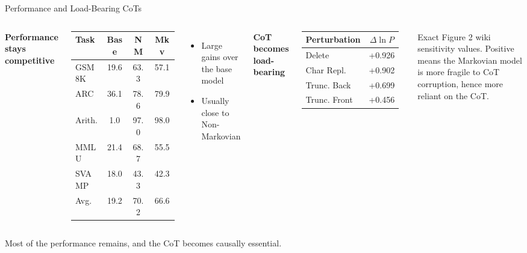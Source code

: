 \documentclass[aspectratio=169]{beamer}
\begin{document}
\begin{frame}{Performance and Load-Bearing CoTs}

\begin{columns}[T]
\textbf{Performance stays competitive}

\begin{table}
\centering
\tiny
\setlength{\tabcolsep}{3pt}
\begin{tabular}{lccc}
\toprule
Task & Base & NM & Mkv \\
\midrule
GSM8K & 19.6 & 63.3 & 57.1 \\
ARC & 36.1 & 78.6 & 79.9 \\
Arith. & 1.0 & 97.0 & 98.0 \\
MMLU & 21.4 & 68.7 & 55.5 \\
SVAMP & 18.0 & 43.3 & 42.3 \\
\midrule
Avg. & 19.2 & 70.2 & 66.6 \\
\bottomrule
\end{tabular}
\end{table}

\begin{itemize}
    \itemsep 0.15em
    \item Large gains over the base model
    \item Usually close to Non-Markovian
\end{itemize}

\textbf{CoT becomes load-bearing}

\begin{table}
\centering
\scriptsize
\begin{tabular}{lc}
\toprule
Perturbation & $\Delta \ln P$ \\
\midrule
Delete & +0.926 \\
Char Repl. & +0.902 \\
Trunc. Back & +0.699 \\
Trunc. Front & +0.456 \\
\bottomrule
\end{tabular}
\end{table}

\vspace{0.05cm}
\scriptsize Exact Figure 2 wiki sensitivity values. Positive means the Markovian model is more fragile to CoT corruption, hence more reliant on the CoT.
\end{columns}

\vspace{0.1cm}
\begin{center}
\colorbox{mkgreen!10}{\parbox{0.9\textwidth}{\centering
Most of the performance remains, and the CoT becomes causally essential.
}}
\end{center}
\end{frame}
\end{document}
